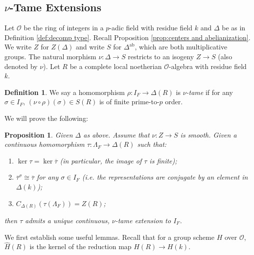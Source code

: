 \documentclass[11pt, letterpaper,english]{amsart}
\theoremstyle{plain}
\newtheorem{prop}[lem]{Proposition}
\theoremstyle{definition}
\newtheorem{defn}[lem]{Definition}
\numberwithin{equation}{section}
\numberwithin{lem}{section}
\newcommand{\cO}{\mathcal{O}}
\DeclareMathOperator{\Ker}{ker}
\newcommand{\taubar}{{\overline{\tau}}}
\newcommand{\ab}{\textrm{ab}}
\newcommand{\cent}[2]{C_{#1}(#2)}
\newcommand{\Ld}{\Lambda}
\newcommand{\Dt}{\Delta}
\begin{document}
\subsection{\texorpdfstring{$\nu$}{v}-Tame Extensions} \label{ss:tameextension}

Let $\cO$ be the ring of integers in a $p$-adic field with residue field $k$ and $\Dt$ be as in Definition \ref{def:decomp type}. Recall Proposition \ref{prop:centers and abelianization}. We write $Z$ for $Z(\Dt)$ and write $S$ for $\Dt^{\ab}$, which are both multiplicative groups. The natural morphism $\nu: \Dt \to S$ restricts to an isogeny $Z \to S$ (also denoted by $\nu$). 
Let $R$ be a complete local noetherian $\cO$-algebra with residue field $k$.


\begin{defn} \label{def:nutame}
We say a homomorphism $\rho: I_F \to \Dt(R)$ is \emph{$\nu$-tame} if for any $\sigma \in I_F$, $(\nu \circ \rho)(\sigma) \in S(R)$ is of finite prime-to-$p$ order. 
\end{defn}


We will prove the following:

\begin{prop} \label{prop:extension}
Given $\Delta$ as above. Assume that $\nu \colon Z \to S$ is smooth.   
Given a continuous homomorphism $\tau: \Ld_F \to \Dt(R)$ such that: 
\begin{enumerate}
    \item \label{prop:extensioni} $\Ker\tau=\Ker\taubar$ (in particular, the image of $\tau$ is finite);
    \item \label{prop:extensionii} $\taubar^{\sigma} \cong \taubar$ for any $\sigma \in I_F$ (i.e. the representations are conjugate by an element in $\Dt(k)$); 
    \item \label{prop:extensioniii} $\cent{\Dt(R)}{\tau(\Ld_F)}=Z(R)$;
\end{enumerate}
then $\tau$ admits a unique continuous, $\nu$-tame extension to $I_F$.
\end{prop}

We first establish some useful lemmas.  Recall that for a group scheme $H$ over $\cO$, $\widehat{H}(R)$ is the kernel of the reduction map $H(R) \to H(k)$.
\end{document}
